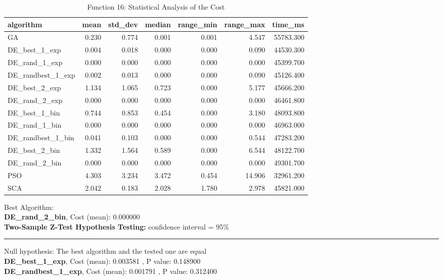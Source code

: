 \documentclass[12pt]{article}
\begin{document}
\begin{table}[H]
    \centering
    \footnotesize
\begin{tabular}{lrrrrrr}
\toprule
         algorithm &  mean &  std\_dev &  median &  range\_min &  range\_max &   time\_ms \\
\midrule
                GA & 0.230 &    0.774 &   0.001 &      0.001 &      4.547 & 55783.300 \\
     DE\_best\_1\_exp & 0.004 &    0.018 &   0.000 &      0.000 &      0.090 & 44530.300 \\
     DE\_rand\_1\_exp & 0.000 &    0.000 &   0.000 &      0.000 &      0.000 & 45399.700 \\
 DE\_randbest\_1\_exp & 0.002 &    0.013 &   0.000 &      0.000 &      0.090 & 45126.400 \\
     DE\_best\_2\_exp & 1.134 &    1.065 &   0.723 &      0.000 &      5.177 & 45666.200 \\
     DE\_rand\_2\_exp & 0.000 &    0.000 &   0.000 &      0.000 &      0.000 & 46461.800 \\
     DE\_best\_1\_bin & 0.744 &    0.853 &   0.454 &      0.000 &      3.180 & 48093.800 \\
     DE\_rand\_1\_bin & 0.000 &    0.000 &   0.000 &      0.000 &      0.000 & 46963.000 \\
 DE\_randbest\_1\_bin & 0.041 &    0.103 &   0.000 &      0.000 &      0.544 & 47283.200 \\
     DE\_best\_2\_bin & 1.332 &    1.564 &   0.589 &      0.000 &      6.544 & 48122.700 \\
     DE\_rand\_2\_bin & 0.000 &    0.000 &   0.000 &      0.000 &      0.000 & 49301.700 \\
               PSO & 4.303 &    3.234 &   3.472 &      0.454 &     14.906 & 32961.200 \\
               SCA & 2.042 &    0.183 &   2.028 &      1.780 &      2.978 & 45821.000 \\
\bottomrule
\end{tabular}

\caption{Function 16: Statistical Analysis of the Cost} 
    \end{table}
Best Algorithm: \\
\textbf{DE\_rand\_2\_bin}, Cost (mean): 0.000000\\
\noindent
\textbf{Two-Sample Z-Test Hypothesis Testing: }
confidence interval = 95\%\\
\vspace{-3mm}
\rule[3mm]{\linewidth}{0.2pt}
Null hypothesis: The best algorithm and the tested one are equal\\
\textbf{DE\_best\_1\_exp}, Cost (mean): 0.003581
, P value: 0.148900\\
\textbf{DE\_randbest\_1\_exp}, Cost (mean): 0.001791
, P value: 0.312400\\
\newpage
\end{document}
